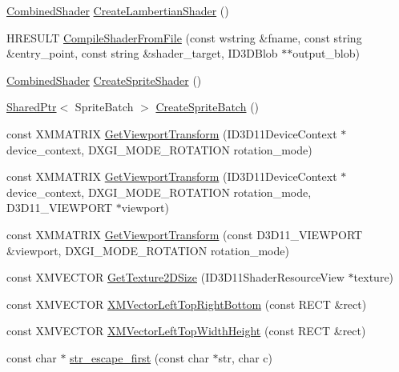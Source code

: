 \begin{DoxyCompactItemize}
\item 
\hyperlink{structmage_1_1_combined_shader}{Combined\+Shader} \hyperlink{namespacemage_ab0bd21012fa29244f0f9b3201bebc2a5}{Create\+Lambertian\+Shader} ()
\item 
H\+R\+E\+S\+U\+LT \hyperlink{namespacemage_af63dbc237d243bcad8b6f2c0a9bb9163}{Compile\+Shader\+From\+File} (const wstring \&fname, const string \&entry\+\_\+point, const string \&shader\+\_\+target, I\+D3\+D\+Blob $\ast$$\ast$output\+\_\+blob)
\item 
\hyperlink{structmage_1_1_combined_shader}{Combined\+Shader} \hyperlink{namespacemage_af6f5c6ae46131caa77e5361d23d5d7c8}{Create\+Sprite\+Shader} ()
\item 
\hyperlink{namespacemage_a1e01ae66713838a7a67d30e44c67703e}{Shared\+Ptr}$<$ Sprite\+Batch $>$ \hyperlink{namespacemage_a92ceaab9ca632db5c310ca4ab5746685}{Create\+Sprite\+Batch} ()
\item 
const X\+M\+M\+A\+T\+R\+IX \hyperlink{namespacemage_a706e1b2866209b405f52e62c521f4884}{Get\+Viewport\+Transform} (I\+D3\+D11\+Device\+Context $\ast$device\+\_\+context, D\+X\+G\+I\+\_\+\+M\+O\+D\+E\+\_\+\+R\+O\+T\+A\+T\+I\+ON rotation\+\_\+mode)
\item 
const X\+M\+M\+A\+T\+R\+IX \hyperlink{namespacemage_a6430737590c5401384e3a65a4f66b240}{Get\+Viewport\+Transform} (I\+D3\+D11\+Device\+Context $\ast$device\+\_\+context, D\+X\+G\+I\+\_\+\+M\+O\+D\+E\+\_\+\+R\+O\+T\+A\+T\+I\+ON rotation\+\_\+mode, D3\+D11\+\_\+\+V\+I\+E\+W\+P\+O\+RT $\ast$viewport)
\item 
const X\+M\+M\+A\+T\+R\+IX \hyperlink{namespacemage_a18ab56ec4969343a6552a73b561ad4ed}{Get\+Viewport\+Transform} (const D3\+D11\+\_\+\+V\+I\+E\+W\+P\+O\+RT \&viewport, D\+X\+G\+I\+\_\+\+M\+O\+D\+E\+\_\+\+R\+O\+T\+A\+T\+I\+ON rotation\+\_\+mode)
\item 
const X\+M\+V\+E\+C\+T\+OR \hyperlink{namespacemage_a32e962380f439a26629371c492643616}{Get\+Texture2\+D\+Size} (I\+D3\+D11\+Shader\+Resource\+View $\ast$texture)
\item 
const X\+M\+V\+E\+C\+T\+OR \hyperlink{namespacemage_aa049ddf42f2937d6bc7f730f4eabf57a}{X\+M\+Vector\+Left\+Top\+Right\+Bottom} (const R\+E\+CT \&rect)
\item 
const X\+M\+V\+E\+C\+T\+OR \hyperlink{namespacemage_a21b11fa85a84f903e3bd4678bf655270}{X\+M\+Vector\+Left\+Top\+Width\+Height} (const R\+E\+CT \&rect)
\item 
const char $\ast$ \hyperlink{namespacemage_a451f2cac5de5cebbe8bc004b3f29857b}{str\+\_\+escape\+\_\+first} (const char $\ast$str, char c)
$$
\end{DoxyCompactItemize}
